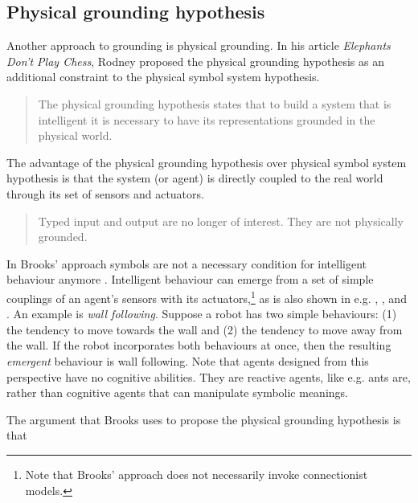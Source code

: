 \subsection{Physical grounding hypothesis}\label{s:theory:pgh}

Another approach to grounding is physical grounding. In his article {\em Elephants Don't Play Chess}, Rodney \citet{brooks:1990} proposed the physical grounding hypothesis as an additional constraint to the physical symbol system hypothesis. 


\begin{quote}
The physical grounding hypothesis states that to build a system that is intelligent it is necessary to have its representations grounded in the physical world. \citep{brooks:1990}
\end{quote}

The advantage of the physical grounding hypothesis over physical symbol system hypothesis is that the system (or agent) is directly coupled to the real world through its set of sensors and actuators. 

\begin{quote}
Typed input and output are no longer of interest. They are not physically grounded. \citep{brooks:1990}
\end{quote}

In Brooks' approach symbols are not a necessary condition for intelligent behaviour anymore \citep{brooks:1990,brooks:1991}. Intelligent behaviour can emerge from a set of simple couplings of an agent's sensors with its actuators,\footnote{Note that Brooks' approach does not necessarily invoke connectionist models.} as is also shown in e.g. \citealt{steelsbrooks:1993}, \citealt{steels:1994}, and \citealt{steels:1996c}. An example is {\em wall following}. Suppose a robot has two simple behaviours: (1) the tendency to move towards the wall and (2) the tendency to move away from the wall. If the robot incorporates both behaviours at once, then the resulting {\em emergent} behaviour is wall following. Note that agents designed from this perspective have no cognitive abilities. They are reactive agents, like e.g. ants are, rather than cognitive agents that can manipulate symbolic meanings.

The argument that Brooks uses to propose the physical grounding hypothesis is that

